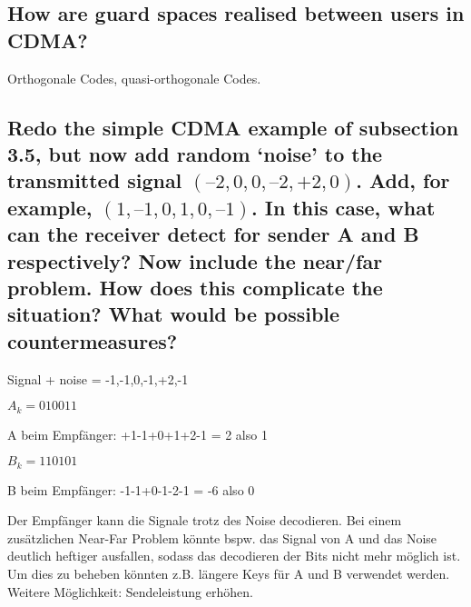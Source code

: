 \subsection{How are guard spaces realised between users in CDMA?}
Orthogonale Codes, quasi-orthogonale Codes.

\subsection{Redo the simple CDMA example of subsection 3.5, but now add random ‘noise’ to the
transmitted signal $(–2,0,0,–2,+2,0)$. Add, for example, $(1,–1,0,1,0,–1)$. In this case,
what can the receiver detect for sender A and B respectively? Now include the
near/far problem. How does this complicate the situation? What would be possible
countermeasures?}

Signal + noise = -1,-1,0,-1,+2,-1

$A_k = 010011$

A beim Empfänger: +1-1+0+1+2-1 = 2 also 1

$B_k = 110101$

B beim Empfänger: -1-1+0-1-2-1 = -6 also 0

Der Empfänger kann die Signale trotz des Noise decodieren. Bei einem zusätzlichen Near-Far Problem könnte bspw. das Signal von A und das Noise deutlich heftiger ausfallen, sodass das decodieren der Bits nicht mehr möglich ist. Um dies zu beheben könnten z.B. längere Keys für A und B verwendet werden. Weitere Möglichkeit: Sendeleistung erhöhen.
